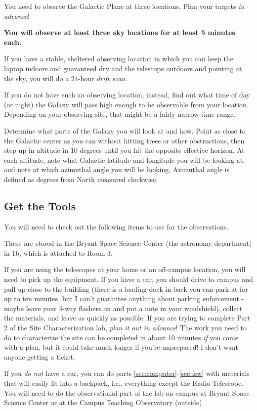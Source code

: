 \documentclass[11pt]{article}
\begin{document}
You need to observe the Galactic Plane at three locations.
Plan your targets \emph{in advance}!

\textbf{You will observe at least three sky locations for at least 5 minutes each.}

If you have a stable, sheltered observing location in which you can keep
the laptop indoors and guaranteed dry and the telescope outdoors and pointing
at the sky, you will do a 24-hour \emph{drift scan}.

If you do not have such an observing location, instead, find out what
time of day (or night) the Galaxy will pass high enough to be observable
from your location.  Depending on your observing site, that might be
a fairly narrow time range.

Determine what parts of the Galaxy you will look at and how.
Point as close to the Galactic center as you can without hitting trees
or other obstructions, then step up in altitude in 10 degrees until you hit the opposite
effective horizon.  At each altitude, note what Galactic latitude and
longitude you will be looking at, and note at which azimuthal angle you will be
looking.  Azimuthal angle is defined as degrees from North measured clockwise.


\clearpage
\subsection{Get the Tools}
\label{sec:gettingthetools}
You will need to check out the following items to use for the observations.

These are stored in the Bryant Space Science Center (the astronomy department) in 1b, which
is attached to Room 3.

If you are using the telescopes at your home or an off-campus location, you will need to pick up
the equipment.
If you have a car, you should drive to campus and pull up close to the building
(there is a loading dock in back you can park at for up to ten minutes, but I can't guarantee
anything about parking enforcement - maybe leave your 4-way flashers on and put a note in your windshield),
collect the materials, and leave as quickly as possible.
If you are trying to complete Part 2 of the Site Characterization lab, \emph{plan it out in advance}!
The work you need to do to characterize the site can be completed in about 10 minutes \emph{if}
you come with a plan, but it could take much longer if you're unprepared!  I don't want anyone getting a ticket.

If you \emph{do not} have a car, you can do parts \ref{sec:computer}-\ref{sec:fsw}
with materials that will easily fit into a backpack, i.e., everything except the Radio Telescope.
You will need to do the observational part of the lab on campus at Bryant Space Science Center or at
the Campus Teaching Observatory (outside).
\end{document}
